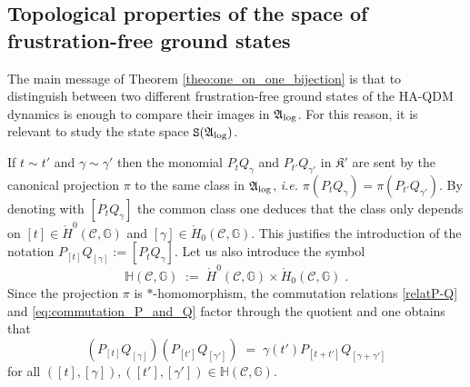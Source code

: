 \documentclass[a4paper,12pt,twoside,reqno]{amsart}
\theoremstyle{plain}
\theoremstyle{definition}
\theoremstyle{remark}
\numberwithin{equation}{section}
\numberwithin{figure}{section}
\numberwithin{table}{section}
\newcommand{\pa}[1]{\left( #1 \right)}
\newcommand{\f}[1]{\mathcal{#1}}
\newcommand{\n}[1]{\mathbb{#1}}
\begin{document}
	
	\subsection{Topological properties of the space of frustration-free ground states}
	The main message of Theorem \ref{theo:one_on_one_bijection} is that to distinguish between two different frustration-free ground states
	of the {HA-QDM dynamics}
	is enough to compare their images in $\mathfrak{A}_{\rm log}$. For this reason, it is relevant to study the state space $\mathtt{S}(\mathfrak{A}_{\rm log})$.
	
	
	
	\medskip
	
	
	
	
	If $t\sim t'$ and $\gamma\sim \gamma'$ then the monomial $P_tQ_\gamma$ and  $P_{t'}Q_{\gamma'}$ in $\mathfrak{K}'$ are sent by the canonical projection $\pi$ to the same class in $\mathfrak{A}_{\rm log}$, \emph{i.e.} $\pi(P_tQ_\gamma)=\pi(P_{t'}Q_{\gamma'})$. By denoting 
	with $[P_tQ_\gamma]$ the common class one deduces that the class only depends on $[t]\in \mathring{H}^0(\f{C},\n{G})$ and $[\gamma]\in\mathring{H}_{0}(\f{C},\n{G})$. This justifies the introduction of the notation $P_{[t]}Q_{[\gamma]}:=[P_tQ_\gamma]$. Let us also introduce the symbol
	\[
	\n{H}(\f{C},\n{G})\;:=\;\mathring{H}^0(\f{C},\n{G})\times\mathring{H}_0(\f{C},\n{G})\;.
	\]
	Since the projection $\pi$ is $\ast$-homomorphism, the commutation relations \eqref{relatP-Q} and \eqref{eq:commutation_P_and_Q} factor through the quotient and one obtains that
	\begin{equation}\label{eq:Weyl1}
		\pa{P_{[t]}Q_{[\gamma]}}\pa{P_{[t']}Q_{[\gamma']}}\;=\;\gamma(t')P_{[t+t']}Q_{[\gamma+\gamma']}
	\end{equation}
	for all $([t],[\gamma]),([t'],[\gamma'])\in \n{H}(\f{C},\n{G})$.
	
	
	\medskip
	
	
	
\end{document}
